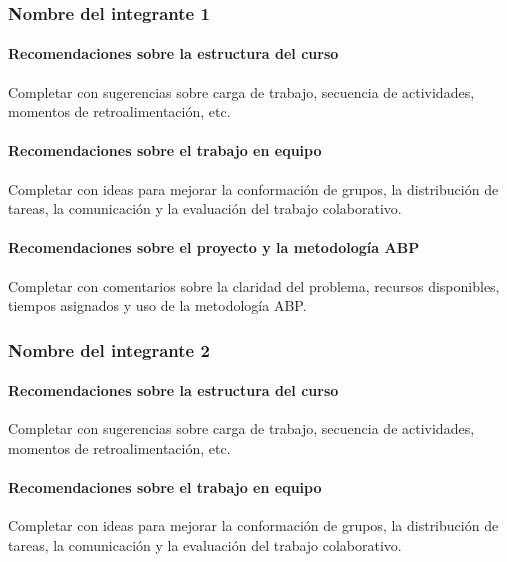 \documentclass[11pt,a4paper]{article}
\begin{document}
\subsubsection*{Nombre del integrante 1}

\paragraph{Recomendaciones sobre la estructura del curso}
Completar con sugerencias sobre carga de trabajo, secuencia de actividades,
momentos de retroalimentación, etc.

\paragraph{Recomendaciones sobre el trabajo en equipo}
Completar con ideas para mejorar la conformación de grupos, la distribución
de tareas, la comunicación y la evaluación del trabajo colaborativo.

\paragraph{Recomendaciones sobre el proyecto y la metodología ABP}
Completar con comentarios sobre la claridad del problema, recursos
disponibles, tiempos asignados y uso de la metodología ABP.

\subsubsection*{Nombre del integrante 2}

\paragraph{Recomendaciones sobre la estructura del curso}
Completar con sugerencias sobre carga de trabajo, secuencia de actividades,
momentos de retroalimentación, etc.

\paragraph{Recomendaciones sobre el trabajo en equipo}
Completar con ideas para mejorar la conformación de grupos, la distribución
de tareas, la comunicación y la evaluación del trabajo colaborativo.
\end{document}
